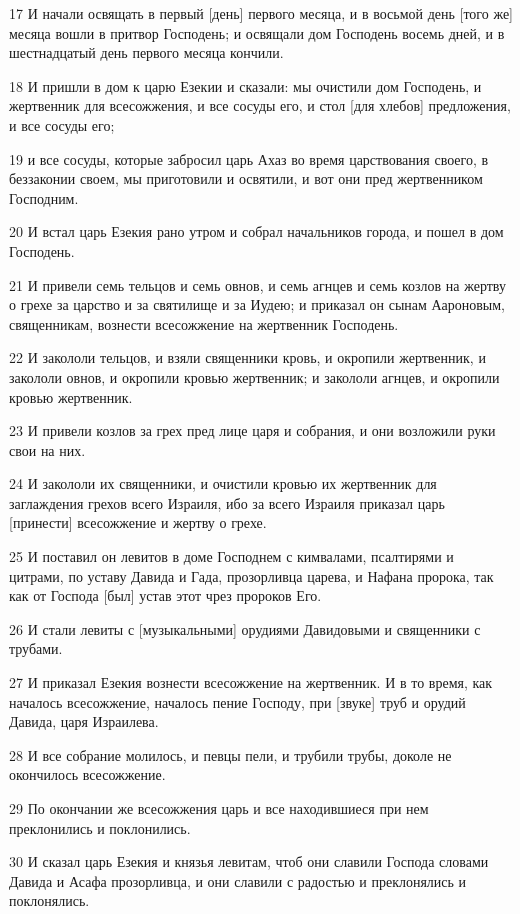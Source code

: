 \par 17 И начали освящать в первый [день] первого месяца, и в восьмой день [того же] месяца вошли в притвор Господень; и освящали дом Господень восемь дней, и в шестнадцатый день первого месяца кончили.
\par 18 И пришли в дом к царю Езекии и сказали: мы очистили дом Господень, и жертвенник для всесожжения, и все сосуды его, и стол [для хлебов] предложения, и все сосуды его;
\par 19 и все сосуды, которые забросил царь Ахаз во время царствования своего, в беззаконии своем, мы приготовили и освятили, и вот они пред жертвенником Господним.
\par 20 И встал царь Езекия рано утром и собрал начальников города, и пошел в дом Господень.
\par 21 И привели семь тельцов и семь овнов, и семь агнцев и семь козлов на жертву о грехе за царство и за святилище и за Иудею; и приказал он сынам Аароновым, священникам, вознести всесожжение на жертвенник Господень.
\par 22 И закололи тельцов, и взяли священники кровь, и окропили жертвенник, и закололи овнов, и окропили кровью жертвенник; и закололи агнцев, и окропили кровью жертвенник.
\par 23 И привели козлов за грех пред лице царя и собрания, и они возложили руки свои на них.
\par 24 И закололи их священники, и очистили кровью их жертвенник для заглаждения грехов всего Израиля, ибо за всего Израиля приказал царь [принести] всесожжение и жертву о грехе.
\par 25 И поставил он левитов в доме Господнем с кимвалами, псалтирями и цитрами, по уставу Давида и Гада, прозорливца царева, и Нафана пророка, так как от Господа [был] устав этот чрез пророков Его.
\par 26 И стали левиты с [музыкальными] орудиями Давидовыми и священники с трубами.
\par 27 И приказал Езекия вознести всесожжение на жертвенник. И в то время, как началось всесожжение, началось пение Господу, при [звуке] труб и орудий Давида, царя Израилева.
\par 28 И все собрание молилось, и певцы пели, и трубили трубы, доколе не окончилось всесожжение.
\par 29 По окончании же всесожжения царь и все находившиеся при нем преклонились и поклонились.
\par 30 И сказал царь Езекия и князья левитам, чтоб они славили Господа словами Давида и Асафа прозорливца, и они славили с радостью и преклонялись и поклонялись.
